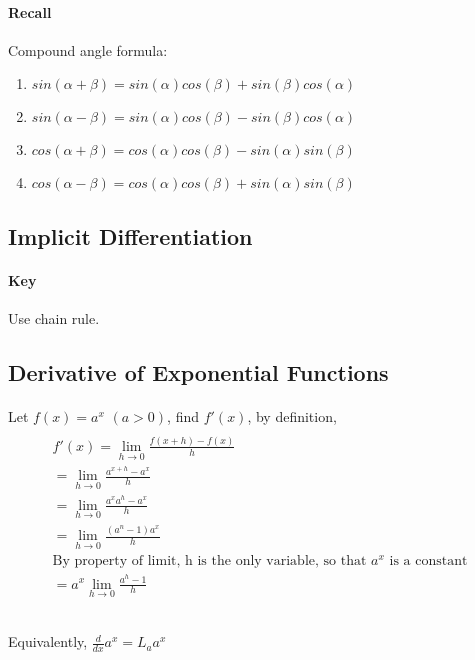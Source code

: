 \documentclass{article}
\begin{document}
	\paragraph{Recall} Compound angle formula:
	\begin{enumerate}
		\item $sin(\alpha + \beta) = sin(\alpha)cos(\beta) + sin(\beta)cos(\alpha)$
		\item $sin(\alpha - \beta) = sin(\alpha)cos(\beta) - sin(\beta)cos(\alpha)$
		\item $cos(\alpha + \beta) = cos(\alpha)cos(\beta) - sin(\alpha)sin(\beta)$
		\item $cos(\alpha - \beta) = cos(\alpha)cos(\beta) + sin(\alpha)sin(\beta)$
	\end{enumerate}
	\subsection{Implicit Differentiation}
	\paragraph{Key} Use chain rule.
	\subsection{Derivative of Exponential Functions}
	\paragraph{} Let $f(x) = a^x$ $(a > 0)$, find $f'(x)$, by definition,
	\begin{multline}
		\\
		f'(x) = \lim_{h \to 0} \frac{f(x+h)-f(x)}{h} \\
		= \lim_{h \to 0} \frac{a^{x+h} - a^x}{h} \\
		= \lim_{h \to 0} \frac{a^x a^h - a^x}{h} \\
		= \lim_{h \to 0} \frac{(a^n - 1)a^x}{h} \\
		\text{By property of limit, h is the only variable, so that $a^x$ is a constant} \\
		= a^x \lim_{h \to 0} \frac{a^h - 1}{h} \\ 
		\\
	\end{multline}
	\paragraph{} Equivalently, $\frac{d}{dx}a^x = L_a a^x$
\end{document}
